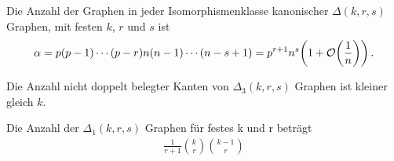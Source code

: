 \documentclass[../Bachelor_LennartKoliwer.tex]{subfiles}
\begin{document}
\begin{lemma}\cite[43]{BaiSilverstein}\label{lem:AnzahlIsomklasse}
    Die Anzahl der Graphen in jeder Isomorphismenklasse kanonischer $\Delta(k,r,s)$ Graphen, mit festen $k$, $r$ und $s$ ist
    \begin{align*}
        \alpha = p(p-1)\cdots(p-r)n(n-1)\cdots(n-s+1)=p^{r+1}n^s\lr{1+\mathcal{O}\lr{\frac1n}}\,.
    \end{align*}
\end{lemma}

\begin{lemma}\cite[43]{BaiSilverstein}\label{lem:AnzahlEinezlKantenKateg3}
    Die Anzahl nicht doppelt belegter Kanten von $\Delta_3(k,r,s)$ Graphen ist kleiner gleich $k$.
\end{lemma}

\begin{lemma}\cite[43]{BaiSilverstein}\label{AnzahlKateg1Graphen}
    Die Anzahl der $\Delta_1(k,r,s)$ Graphen für festes k und r beträgt
    \begin{align*}
        \frac{1}{r+1}\binom{k}{r}\binom{k-1}{r}
    \end{align*}
\end{lemma}
\end{document}
